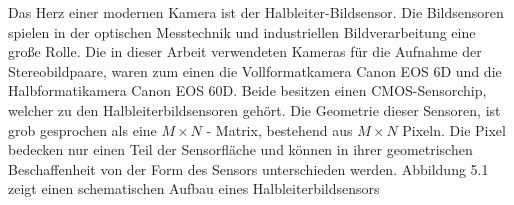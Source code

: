 %	


Das Herz einer modernen Kamera ist der Halbleiter-Bildsensor. Die Bildsensoren spielen in der optischen Messtechnik und industriellen Bildverarbeitung eine große Rolle\cite{Photonik}. Die in dieser Arbeit verwendeten Kameras für die Aufnahme der Stereobildpaare, waren zum einen die Vollformatkamera Canon EOS 6D und die Halbformatikamera Canon EOS 60D. Beide besitzen einen CMOS-Sensorchip, welcher zu den Halbleiterbildsensoren gehört\cite{Canon6D}. Die Geometrie dieser Sensoren, ist grob gesprochen als eine $M \times N$ - Matrix, bestehend aus $M \times N$ Pixeln. Die Pixel bedecken nur einen Teil der Sensorfläche und können in ihrer geometrischen Beschaffenheit von der Form des Sensors unterschieden werden\cite{Photonik}. Abbildung 5.1 zeigt einen schematischen Aufbau eines Halbleiterbildsensors\\

